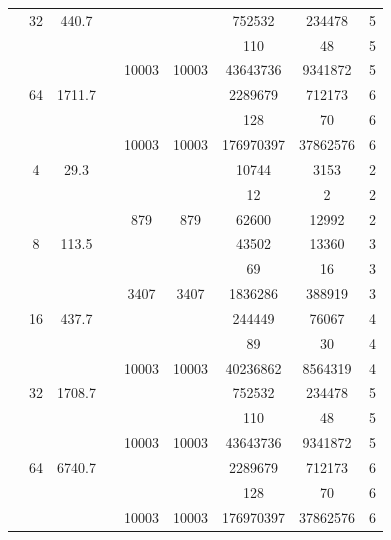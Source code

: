 \begin{table}[htbp]
\begin{tabular}{l S[table-format=3.0] S[table-format=4.1] l S[table-format=6.0] S[table-format=6.0] S[table-format=6.0] S[table-format=5.0] S[table-format=2.0]}
     & 32 & 440.7 &  & {\text{---}} & {\text{---}} & 752532 & 234478 & 5 \\
     &  &  &  & {\text{---}} & {\text{---}} & 110 & 48 & 5 \\
     &  &  &  & 10003 & 10003 & 43643736 & 9341872 & 5 \\
     & 64 & 1711.7 &  & {\text{---}} & {\text{---}} & 2289679 & 712173 & 6 \\
     &  &  &  & {\text{---}} & {\text{---}} & 128 & 70 & 6 \\
     &  &  &  & 10003 & 10003 & 176970397 & 37862576 & 6 \\
    \midrule
     & 4 & 29.3 &  & {\text{---}} & {\text{---}} & 10744 & 3153 & 2 \\
     &  &  &  & {\text{---}} & {\text{---}} & 12 & 2 & 2 \\
     &  &  &  & 879 & 879 & 62600 & 12992 & 2 \\
     & 8 & 113.5 &  & {\text{---}} & {\text{---}} & 43502 & 13360 & 3 \\
     &  &  &  & {\text{---}} & {\text{---}} & 69 & 16 & 3 \\
     &  &  &  & 3407 & 3407 & 1836286 & 388919 & 3 \\
     & 16 & 437.7 &  & {\text{---}} & {\text{---}} & 244449 & 76067 & 4 \\
     &  &  &  & {\text{---}} & {\text{---}} & 89 & 30 & 4 \\
     &  &  &  & 10003 & 10003 & 40236862 & 8564319 & 4 \\
     & 32 & 1708.7 &  & {\text{---}} & {\text{---}} & 752532 & 234478 & 5 \\
     &  &  &  & {\text{---}} & {\text{---}} & 110 & 48 & 5 \\
     &  &  &  & 10003 & 10003 & 43643736 & 9341872 & 5 \\
     & 64 & 6740.7 &  & {\text{---}} & {\text{---}} & 2289679 & 712173 & 6 \\
     &  &  &  & {\text{---}} & {\text{---}} & 128 & 70 & 6 \\
     &  &  &  & 10003 & 10003 & 176970397 & 37862576 & 6 \\
    \bottomrule
  \end{tabular}
\end{table}

